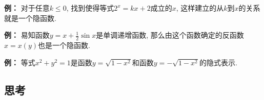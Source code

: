 \documentclass[a4paper,punct=CCT]{ctexbook}
\theoremstyle{break}
\newenvironment{example}[1][]{\noindent\textbf{例#1：}}{}
\let\leq\leqslant
\let\le\leq
\begin{document}
\begin{example}
  对于任意\(k \le 0\), 找到使得等式\(2^x = kx + 2\)成立的\(x\), 这样建立的从\(k\)到\(x\)的关系就是一个隐函数.
\end{example}

\begin{example}
  易知函数\(y = x + \frac12 \sin x\)是单调递增函数, 那么由这个函数确定的反函数\(x = x(y)\)也是一个隐函数.
\end{example}

\begin{example}
  等式\(x^2 + y^2 = 1\)是函数\(y = \sqrt{1 - x^2}\)和函数\(y = -\sqrt{1 - x^2}\)的隐式表示.
\end{example}

\subsection*{思考}
\end{document}
